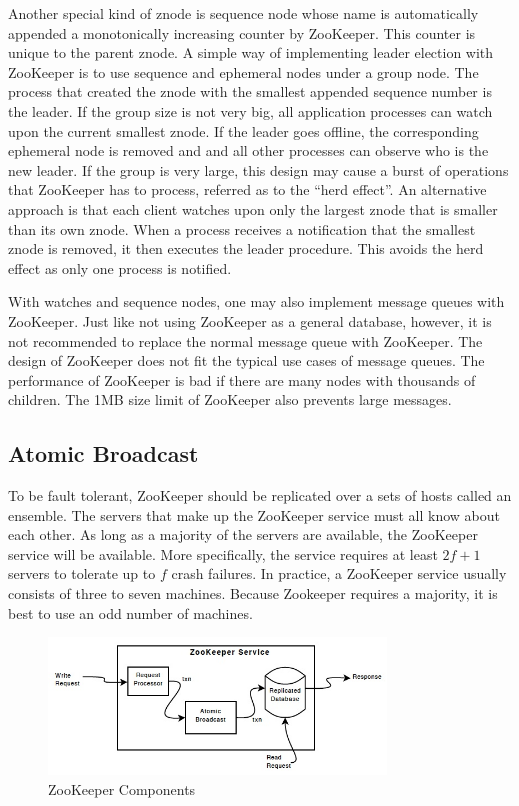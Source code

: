 \documentclass[11pt]{book}
\begin{document}
Another special kind of znode is sequence node whose name is automatically appended a monotonically increasing counter by ZooKeeper. This counter is unique to the parent znode. A simple way of implementing leader election with ZooKeeper is to use sequence and ephemeral nodes under a group node. The process that created the znode with the smallest appended sequence number is the leader. If the group size is not very big, all application processes can watch upon the current smallest znode. If the leader goes offline, the corresponding ephemeral node is removed and and all other processes can observe who is the new leader. If the group is very large, this design may cause a burst of operations that ZooKeeper has to process, referred as to the ``herd effect''. An alternative approach is that each client watches upon only the largest znode that is smaller than its own znode. When a process receives a notification that the smallest znode is removed, it then executes the leader procedure. This avoids the herd effect as only one process is notified.

With watches and sequence nodes, one may also implement message queues with ZooKeeper. Just like not using ZooKeeper as a general database, however, it is not recommended to replace the normal message queue with ZooKeeper. The design of ZooKeeper does not fit the typical use cases of message queues. The performance of ZooKeeper is bad if there are many nodes with thousands of children. The 1MB size limit of ZooKeeper also prevents large messages.

\subsection{Atomic Broadcast}
To be fault tolerant, ZooKeeper should be replicated over a sets of hosts called an ensemble. The servers that make up the ZooKeeper service must all know about each other. As long as a majority of the servers are available, the ZooKeeper service will be available. More specifically, the service requires at least $2f+1$ servers to tolerate up to $f$ crash failures. In practice, a ZooKeeper service usually consists of three to seven machines. Because Zookeeper requires a majority, it is best to use an odd number of machines.

\begin{figure}[t]
\includegraphics[width=0.8\textwidth]{images/zookeeper.jpg}
\centering
\caption{ZooKeeper Components}
\end{figure}
\end{document}
